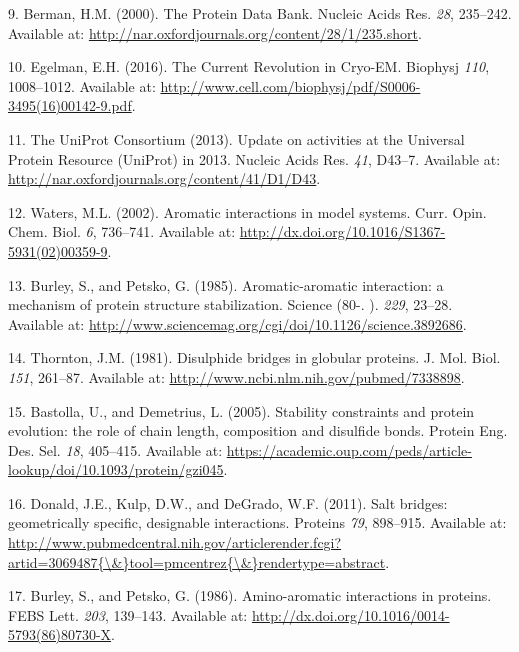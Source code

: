 \documentclass[12pt,a4paper,twoside]{book}
\theoremstyle{definition}
\theoremstyle{definition}
\theoremstyle{remark}
\begin{document}
\hypertarget{ref-Berman2000}{}
9. Berman, H.M. (2000). The Protein Data Bank. Nucleic Acids Res.
\emph{28}, 235--242. Available at:
\url{http://nar.oxfordjournals.org/content/28/1/235.short}.

\hypertarget{ref-Egelman2016}{}
10. Egelman, E.H. (2016). The Current Revolution in Cryo-EM. Biophysj
\emph{110}, 1008--1012. Available at:
\url{http://www.cell.com/biophysj/pdf/S0006-3495(16)00142-9.pdf}.

\hypertarget{ref-TheUniProtConsortium2013}{}
11. The UniProt Consortium (2013). Update on activities at the Universal
Protein Resource (UniProt) in 2013. Nucleic Acids Res. \emph{41},
D43--7. Available at:
\url{http://nar.oxfordjournals.org/content/41/D1/D43}.

\hypertarget{ref-Waters2002}{}
12. Waters, M.L. (2002). Aromatic interactions in model systems. Curr.
Opin. Chem. Biol. \emph{6}, 736--741. Available at:
\url{http://dx.doi.org/10.1016/S1367-5931(02)00359-9}.

\hypertarget{ref-Burley1985}{}
13. Burley, S., and Petsko, G. (1985). Aromatic-aromatic interaction: a
mechanism of protein structure stabilization. Science (80-. ).
\emph{229}, 23--28. Available at:
\url{http://www.sciencemag.org/cgi/doi/10.1126/science.3892686}.

\hypertarget{ref-Thornton1981}{}
14. Thornton, J.M. (1981). Disulphide bridges in globular proteins. J.
Mol. Biol. \emph{151}, 261--87. Available at:
\url{http://www.ncbi.nlm.nih.gov/pubmed/7338898}.

\hypertarget{ref-Bastolla2005}{}
15. Bastolla, U., and Demetrius, L. (2005). Stability constraints and
protein evolution: the role of chain length, composition and disulfide
bonds. Protein Eng. Des. Sel. \emph{18}, 405--415. Available at:
\url{https://academic.oup.com/peds/article-lookup/doi/10.1093/protein/gzi045}.

\hypertarget{ref-Donald2011}{}
16. Donald, J.E., Kulp, D.W., and DeGrado, W.F. (2011). Salt bridges:
geometrically specific, designable interactions. Proteins \emph{79},
898--915. Available at:
\href{http://www.pubmedcentral.nih.gov/articlerender.fcgi?artid=3069487\%7B/\&\%7Dtool=pmcentrez\%7B/\&\%7Drendertype=abstract}{http://www.pubmedcentral.nih.gov/articlerender.fcgi?artid=3069487\{\textbackslash{}\&\}tool=pmcentrez\{\textbackslash{}\&\}rendertype=abstract}.

\hypertarget{ref-Burley1986}{}
17. Burley, S., and Petsko, G. (1986). Amino-aromatic interactions in
proteins. FEBS Lett. \emph{203}, 139--143. Available at:
\url{http://dx.doi.org/10.1016/0014-5793(86)80730-X}.
\end{document}
